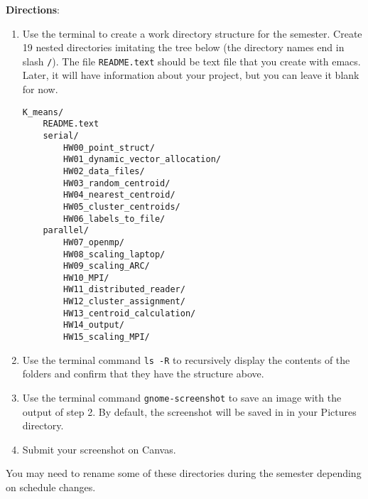\noindent \textbf{Directions}:
\begin{enumerate}
\item Use the terminal to create a work directory structure for the semester.
Create 19 nested directories imitating the tree below
(the directory names end in slash \texttt{/}).
The file \texttt{README.text} should be text file that you create with emacs.
Later, it will have information about your project,
but you can leave it blank for now.

\begin{verbatim}
K_means/
    README.text
    serial/
        HW00_point_struct/
        HW01_dynamic_vector_allocation/
        HW02_data_files/
        HW03_random_centroid/
        HW04_nearest_centroid/
        HW05_cluster_centroids/
        HW06_labels_to_file/
    parallel/
        HW07_openmp/
        HW08_scaling_laptop/
        HW09_scaling_ARC/
        HW10_MPI/
        HW11_distributed_reader/
        HW12_cluster_assignment/
        HW13_centroid_calculation/
        HW14_output/
        HW15_scaling_MPI/
\end{verbatim}
\item Use the terminal command \texttt{ls -R} to recursively display the contents of the folders and confirm that they have the structure above.

\item Use the terminal command \texttt{gnome-screenshot} to save an image with the output of step 2. By default, the screenshot will be saved in in your Pictures directory.
\item Submit your screenshot on Canvas.
\end{enumerate}
You may need to rename some of these directories during the semester depending on schedule changes.